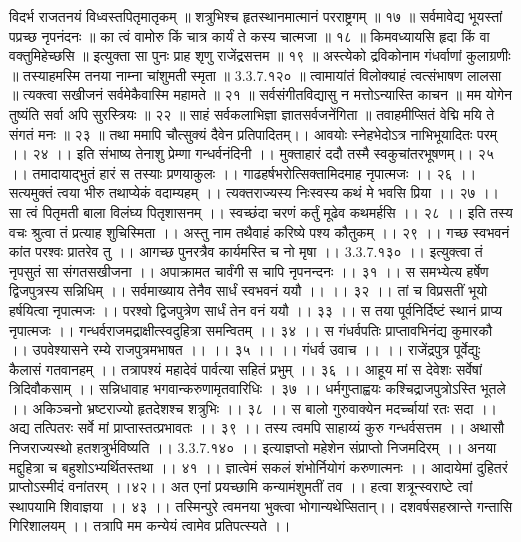 विदर्भ राजतनयं विध्वस्तपितृमातृकम् ॥
शत्रुभिश्च हृतस्थानमात्मानं परराष्ट्रगम् ॥ १७ ॥
सर्वमावेद्य भूयस्तां पप्रच्छ नृपनंदनः ॥
का त्वं वामोरु किं चात्र कार्यं ते कस्य चात्मजा ॥ १८ ॥
किमवध्यायसि हृदा किं वा वक्तुमिहेच्छसि ॥
इत्युक्ता सा पुनः प्राह शृणु राजेंद्रसत्तम ॥ १९ ॥
अस्त्येको द्रविकोनाम गंधर्वाणां कुलाग्रणीः ॥
तस्याहमस्मि तनया नाम्ना चांशुमती स्मृता ॥ 3.3.7.१२० ॥
त्वामायांतं विलोक्याहं त्वत्संभाषण लालसा ॥
त्यक्त्वा सखीजनं सर्वमेकैवास्मि महामते ॥ २१ ॥
सर्वसंगीतविद्यासु न मत्तोऽन्यास्ति काचन ॥
मम योगेन तुष्यंति सर्वा अपि सुरस्त्रियः ॥ २२ ॥
साहं सर्वकलाभिज्ञा ज्ञातसर्वजनेंगिता ॥
तवाहमीप्सितं वेद्मि मयि ते संगतं मनः ॥ २३ ॥
तथा ममापि चौत्सुक्यं दैवेन प्रतिपादितम्।।
आवयोः स्नेहभेदोऽत्र नाभिभूयादितः परम् ।। २४ ।।
इति संभाष्य तेनाशु प्रेम्णा गन्धर्वनंदिनी ।।
मुक्ताहारं ददौ तस्मै स्वकुचांतरभूषणम्।। २५ ।।
तमादायाद्भुतं हारं स तस्याः प्रणयाकुलः ।।
गाढहर्षभरोत्सिक्तामिदमाह नृपात्मजः ।। २६ ।।
सत्यमुक्तं त्वया भीरु तथाप्येकं वदाम्यहम् ।।
त्यक्तराज्यस्य निःस्वस्य कथं मे भवसि प्रिया ।। २७ ।।
सा त्वं पितृमती बाला विलंघ्य पितृशासनम् ।।
स्वच्छंदा चरणं कर्तुं मूढेव कथमर्हसि ।। २८ ।।
इति तस्य वचः श्रुत्वा तं प्रत्याह शुचिस्मिता ।।
अस्तु नाम तथैवाहं करिष्ये पश्य कौतुकम् ।। २९ ।।
गच्छ स्वभवनं कांत परश्वः प्रातरेव तु ।।
आगच्छ पुनरत्रैव कार्यमस्ति च नो मृषा ।। 3.3.7.१३० ।।
इत्युक्त्वा तं नृपसुतं सा संगतसखीजना ।।
अपाक्रामत चार्वंगी स चापि नृपनन्दनः ।। ३१ ।।
स समभ्येत्य हर्षेण द्विजपुत्रस्य सन्निधिम् ।।
सर्वमाख्याय तेनैव सार्धं स्वभवनं ययौ ।। ।। ३२ ।।
तां च विप्रसतीं भूयो हर्षयित्वा नृपात्मजः ।।
परश्वो द्विजपुत्रेण सार्धं तेन वनं ययौ ।। ३३ ।।
स तया पूर्वनिर्दिष्टं स्थानं प्राप्य नृपात्मजः ।।
गन्धर्वराजमद्राक्षीत्स्वदुहित्रा समन्वितम् ।। ३४ ।।
स गंधर्वपतिः प्राप्तावभिनंद्य कुमारकौ ।।
उपवेश्यासने रम्ये राजपुत्रमभाषत ।। ।। ३५ ।।
।। गंधर्व उवाच ।। ।।
राजेंद्रपुत्र पूर्वेद्युः कैलासं गतवानहम् ।।
तत्रापश्यं महादेवं पार्वत्या सहितं प्रभुम् ।। ३६ ।।
आहूय मां स देवेशः सर्वेषां त्रिदिवौकसाम् ।।
सन्निधावाह भगवान्करुणामृतवारिधिः । ३७ ।।
धर्मगुप्ताह्वयः कश्चिद्राजपुत्रोऽस्ति भूतले ।।
अकिञ्चनो भ्रष्टराज्यो हृतदेशश्च शत्रुभिः ।। ३८ ।।
स बालो गुरुवाक्येन मदर्च्चायां रतः सदा ।।
अद्य तत्पितरः सर्वे मां प्राप्तास्तत्प्रभावतः ।। ३९ ।।
तस्य त्वमपि साहाय्यं कुरु गन्धर्वसत्तम ।।
अथासौ निजराज्यस्थो हतशत्रुर्भविष्यति ।। 3.3.7.१४० ।।
इत्याज्ञप्तो महेशेन संप्राप्तो निजमदिरम् ।।
अनया मद्दुहित्रा च बहुशोऽभ्यर्थितस्तथा ।। ४१ ।।
ज्ञात्वेमं सकलं शंभोर्नियोगं करुणात्मनः ।।
आदायेमां दुहितरं प्राप्तोऽस्मीदं वनांतरम् ।।४२।।
अत एनां प्रयच्छामि कन्यामंशुमतीं तव ।।
हत्वा शत्रून्स्वराष्टे त्वां स्थापयामि शिवाज्ञया ।। ४३ ।।
तस्मिन्पुरे त्वमनया भुक्त्वा भोगान्यथेप्सितान्।।
दशवर्षसहस्रान्ते गन्तासि गिरिशालयम् ।।
तत्रापि मम कन्येयं त्वामेव प्रतिपत्स्यते ।।
